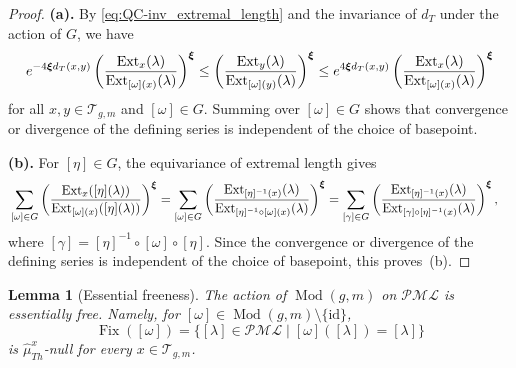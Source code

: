 \documentclass[dvipdfmx]{amsart}
\newtheorem{lemma}{Lemma}[section]
\theoremstyle{remark}
\newcommand{\ext}{{\rm Ext}}
\newcommand{\teich}{\mathcal{T}}
\newcommand{\tmod}{\operatorname{Mod}}
\newcommand{\PThursM}{\hat{\mu}_{Th}}
\newcommand{\convgenus}{{\boldsymbol \xi}}
\newcommand{\pml}{\mathcal{PML}}
\begin{document}
\begin{proof}
\textbf{(a).}
By \eqref{eq:QC-inv_extremal_length} and the invariance of $d_T$ under the action of $G$, we have
\[
e^{-4\convgenus d_T(x,y)}
\left(
\frac{\ext_x(\lambda)}
{\ext_{[\omega](x)}(\lambda)}
\right)^{\convgenus}
\le
\left(
\frac{\ext_y(\lambda)}
{\ext_{[\omega](y)}(\lambda)}
\right)^{\convgenus}
\le
e^{4\convgenus d_T(x,y)}
\left(
\frac{\ext_x(\lambda)}
{\ext_{[\omega](x)}(\lambda)}
\right)^{\convgenus}
\]
for all $x,y\in\teich_{g,m}$ and $[\omega]\in G$.
Summing over $[\omega]\in G$ shows that convergence or divergence
of the defining series is independent of the choice of basepoint.

\medskip
\noindent
\textbf{(b).}
For $[\eta]\in G$, the equivariance of extremal length gives
\begin{align*}
&\sum_{[\omega]\in G}
\left(
\frac{\ext_x([\eta](\lambda))}
     {\ext_{[\omega](x)}([\eta](\lambda))}
\right)^{\convgenus} =
\sum_{[\omega]\in G}
\left(
\frac{\ext_{[\eta]^{-1}(x)}(\lambda)}
     {\ext_{[\eta]^{-1}\circ[\omega](x)}(\lambda)}
\right)^{\convgenus}=
\sum_{[\gamma]\in G}
\left(
\frac{\ext_{[\eta]^{-1}(x)}(\lambda)}
     {\ext_{[\gamma]\circ[\eta]^{-1}(x)}(\lambda)}
\right)^{\convgenus},
\end{align*}
where $[\gamma]=[\eta]^{-1}\circ[\omega]\circ[\eta]$.
Since the convergence or divergence of the defining series is independent of the choice of basepoint, this proves~(b).
\end{proof}

\begin{lemma}[Essential freeness]
\label{lem:Fix_null}
The action of $\tmod(g,m)$ on $\pml$ is essentially free.
Namely, for $[\omega]\in \tmod(g,m)\setminus \{\mathrm{id}\}$, 
\[
\operatorname{Fix}([\omega])
=
\{[\lambda]\in\pml\mid
[\omega]([\lambda])=[\lambda]\}
\]
is $\PThursM^x$-null for every $x\in\teich_{g,m}$.
\end{lemma}
\end{document}
